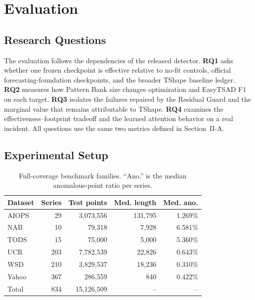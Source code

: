 \section{Evaluation}

\subsection{Research Questions}

The evaluation follows the dependencies of the released detector. \textbf{RQ1} asks whether one frozen \method{} checkpoint is effective relative to no-fit controls, official forecasting-foundation checkpoints, and the broader TShape baseline ledger. \textbf{RQ2} measures how Pattern Bank size changes optimization and EasyTSAD F1 on each target. \textbf{RQ3} isolates the failures repaired by the Residual Guard and the marginal value that remains attributable to TShape. \textbf{RQ4} examines the effectiveness--footprint tradeoff and the learned attention behavior on a real incident. All questions use the same two metrics defined in Section~II-A.

\subsection{Experimental Setup}

\begin{table}[t]
\caption{Full-coverage benchmark families. ``Ano.'' is the median anomalous-point ratio per series.}
\label{tab:data}
\centering
\scriptsize
\setlength{\tabcolsep}{3.2pt}
\begin{tabular}{lrrrr}
\toprule
Dataset & Series & Test points & Med. length & Med. ano. \\
\midrule
AIOPS & 29 & 3,073,556 & 131,795 & 1.269\% \\
NAB & 10 & 79,318 & 7,928 & 6.581\% \\
TODS & 15 & 75,000 & 5,000 & 5.360\% \\
UCR & 203 & 7,782,539 & 22,826 & 0.643\% \\
WSD & 210 & 3,829,537 & 18,236 & 0.310\% \\
Yahoo & 367 & 286,559 & 840 & 0.422\% \\
\midrule
Total & 834 & 15,126,509 & -- & -- \\
\bottomrule
\end{tabular}
\end{table}

